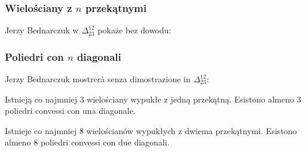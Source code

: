 \subsubsection{Wielościany z $n$ przekątnymi} %
Jerzy Bednarczuk w $\Delta_{23}^{12}$ pokaże bez dowodu: %
\subsubsection{Poliedri con $n$ diagonali} %
Jerzy Bednarczuk mostrerà senza dimostrazione in $\Delta_{23}^{12}$: %

\begin{proposition}
    Istnieją co najmniej 3 wielościany wypukłe z jedną przekątną. %
    Esistono almeno 3 poliedri convessi con una diagonale. %
\end{proposition}

\begin{proposition}
    Istnieje co najmniej 8 wielościanów wypukłych z dwiema przekątnymi. %
    Esistono almeno 8 poliedri convessi con due diagonali. %
\end{proposition}

%